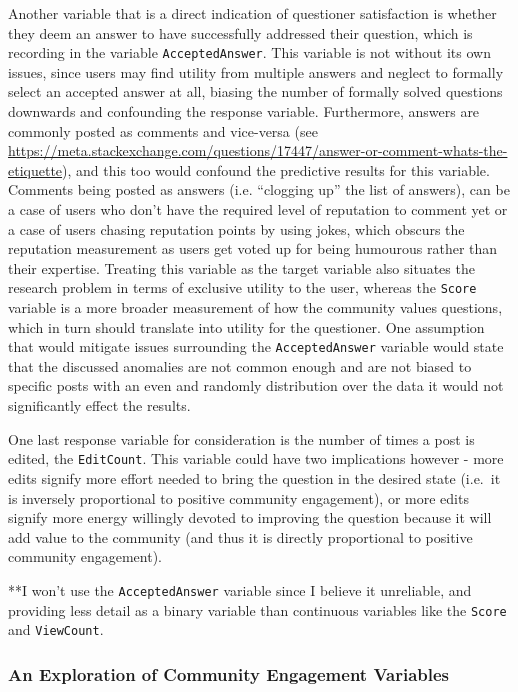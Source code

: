 \documentclass[11pt,preprint, authoryear]{article}
\numberwithin{equation}{section}
\begin{document}
Another variable that is a direct indication of questioner satisfaction
is whether they deem an answer to have successfully addressed their
question, which is recording in the variable \texttt{AcceptedAnswer}.
This variable is not without its own issues, since users may find
utility from multiple answers and neglect to formally select an accepted
answer at all, biasing the number of formally solved questions downwards
and confounding the response variable. Furthermore, answers are commonly
posted as comments and vice-versa (see
\url{https://meta.stackexchange.com/questions/17447/answer-or-comment-whats-the-etiquette}),
and this too would confound the predictive results for this variable.
Comments being posted as answers (i.e. ``clogging up'' the list of
answers), can be a case of users who don't have the required level of
reputation to comment yet or a case of users chasing reputation points
by using jokes, which obscurs the reputation measurement as users get
voted up for being humourous rather than their expertise. Treating this
variable as the target variable also situates the research problem in
terms of exclusive utility to the user, whereas the \texttt{Score}
variable is a more broader measurement of how the community values
questions, which in turn should translate into utility for the
questioner. One assumption that would mitigate issues surrounding the
\texttt{AcceptedAnswer} variable would state that the discussed
anomalies are not common enough and are not biased to specific posts
with an even and randomly distribution over the data it would not
significantly effect the results.

One last response variable for consideration is the number of times a
post is edited, the \texttt{EditCount}. This variable could have two
implications however - more edits signify more effort needed to bring
the question in the desired state (i.e.~it is inversely proportional to
positive community engagement), or more edits signify more energy
willingly devoted to improving the question because it will add value to
the community (and thus it is directly proportional to positive
community engagement).

**I won't use the \texttt{AcceptedAnswer} variable since I believe it
unreliable, and providing less detail as a binary variable than
continuous variables like the \texttt{Score} and \texttt{ViewCount}.

\subsubsection{\texorpdfstring{An Exploration of Community Engagement
Variables
\label{Vars}}{An Exploration of Community Engagement Variables }}\label{an-exploration-of-community-engagement-variables-1}
\end{document}
